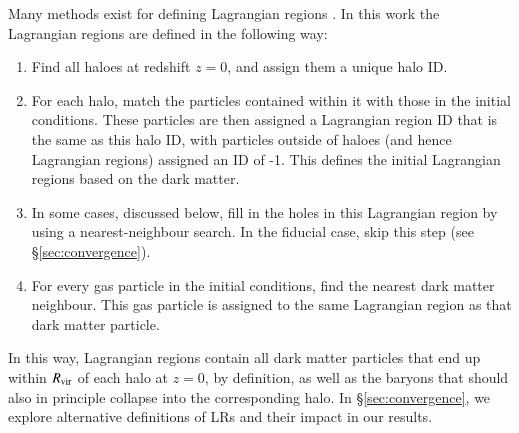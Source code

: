 Many methods exist for defining Lagrangian regions \citep[see e.g. ][ for a
collection of methods]{Onorbe2014}. In this work the Lagrangian regions are
defined in the following way:
\begin{enumerate}
	\item Find all haloes at redshift $z=0$, and assign them a unique halo ID.

    \item For each halo, match the particles contained within it with those
		  in the initial conditions. These particles are then assigned a Lagrangian
		  region ID that is the same as this halo ID, with particles outside of haloes
		  (and hence Lagrangian regions) assigned an ID of -1. This defines the initial
		  Lagrangian regions based on the dark matter.

	\item In some cases, discussed below, fill in the holes in this Lagrangian
		  region by using a nearest-neighbour search. In the fiducial case, skip
		  this step (see \S \ref{sec:convergence}).

	\item For every gas particle in the initial conditions, find the nearest dark
	      matter neighbour. This gas particle is assigned to the same Lagrangian
	      region as that dark matter particle.
\end{enumerate}
In this way, Lagrangian regions contain all dark matter particles that end up
within $R_{\rm vir}$ of each halo at $z=0$, by definition, as well as the
baryons that should also in principle collapse into the corresponding halo.
In \S \ref{sec:convergence}, we explore alternative definitions of LRs and
their impact in our results.